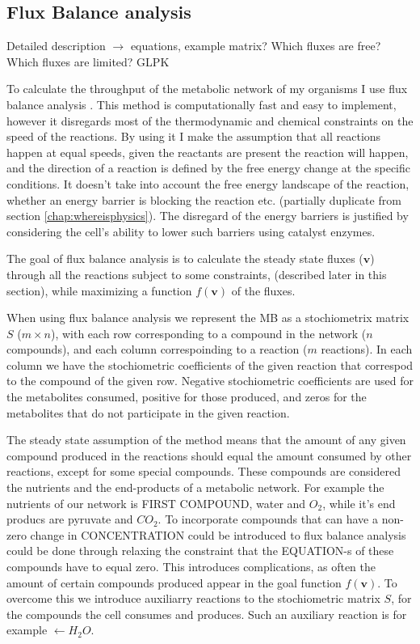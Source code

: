 \documentclass[10pt,a4paper]{article}
\begin{document}
\subsection{Flux Balance analysis}
\label{sub:Flux Balance analysis}

Detailed description $\rightarrow$ equations, example matrix? Which fluxes are free? Which fluxes are limited? GLPK 



	To calculate the throughput of the metabolic network of my organisms I use flux balance analysis \cite{whatisfluxbalance}. This method is computationally fast and easy to implement, however it disregards most of the thermodynamic and chemical constraints on the speed of the reactions. By using it I make the assumption that all reactions happen at equal speeds, given the reactants are present the reaction will happen, and the direction of a reaction is defined by the free energy change at the specific conditions. It doesn't take into account the free energy landscape of the reaction, whether an energy barrier is blocking the reaction etc. (partially duplicate from section \ref{chap:whereisphysics}). The disregard of the energy barriers is justified by considering the cell's ability to lower such barriers using catalyst enzymes.
	
	The goal of flux balance analysis is to calculate the steady state fluxes ($\mathbf{v}$) through all the reactions subject to some constraints, (described later in this section), while maximizing a function $f \left( \mathbf{v} \right)$ of the fluxes. 

	When using flux balance analysis we represent the MB as a stochiometrix matrix $S$ ($m\times n$), with each row corresponding to a compound in the network ($n$ compounds), and each column correspoinding to a reaction ($m$ reactions). In each column we have the stochiometric coefficients of the given reaction that correspod to the compound of the given row. Negative stochiometric coefficients are used for the metabolites consumed, positive for those produced, and zeros for the metabolites that do not participate in the given reaction.
 
	The steady state assumption of the method means that the amount of any given compound produced in the reactions should equal the amount consumed by other reactions, except for some special compounds. These compounds are considered the nutrients and the end-products of a metabolic network. For example the nutrients of our network is FIRST COMPOUND, water and $O_2$, while it's end producs are pyruvate and $CO_2$. To incorporate compounds that can have a non-zero change in CONCENTRATION could be introduced to flux balance analysis could be done through relaxing the constraint that the EQUATION-s of these compounds have to equal zero. This introduces complications, as often the amount of certain compounds produced appear in the goal function $f \left( \mathbf{v} \right) $. To overcome this we introduce auxiliarry reactions to the stochiometric matrix $S$, for the compounds the cell consumes and produces. Such an auxiliary reaction is for example $ \leftarrow H_2O$. 
\end{document}
